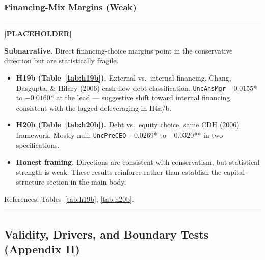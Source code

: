 \documentclass[11pt,a4paper,twocolumn]{article}
\newenvironment{placeholder}{%
  \par\medskip\noindent%
  {\color{placeholderaccent}\rule{\linewidth}{0.4pt}}\par%
  \noindent\textbf{\color{placeholderaccent}[PLACEHOLDER]}\par%
  \smallskip\itshape%
}{%
  \par\upshape\smallskip%
  {\color{placeholderaccent}\rule{\linewidth}{0.4pt}}\par\medskip%
}
\begin{document}
\subsubsection{Financing-Mix Margins (Weak)}
\label{sec:appI_h19b}
\begin{placeholder}
\textbf{Subnarrative.} Direct financing-choice margins point in the
conservative direction but are statistically fragile.
\begin{itemize}
  \item \textbf{H19b (Table~\ref{tab:h19b}).} External vs.\ internal
        financing, Chang, Dasgupta, \& Hilary (2006) cash-flow
        debt-classification. \texttt{UncAnsMgr} $-0.0155$* to
        $-0.0160$* at the lead --- suggestive shift toward internal
        financing, consistent with the lagged deleveraging in H4a/b.
  \item \textbf{H20b (Table~\ref{tab:h20b}).} Debt vs.\ equity choice,
        same CDH (2006) framework. Mostly null; \texttt{UncPreCEO}
        $-0.0269$* to $-0.0320$** in two specifications.
  \item \textbf{Honest framing.} Directions are consistent with
        conservatism, but statistical strength is weak. These results
        reinforce rather than establish the capital-structure
        section in the main body.
\end{itemize}
References: Tables~\ref{tab:h19b}, \ref{tab:h20b}.
\end{placeholder}

\subsection{Validity, Drivers, and Boundary Tests (Appendix II)}
\label{sec:appII}
\end{document}
